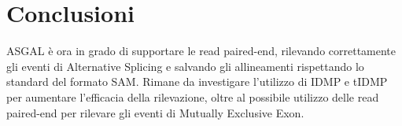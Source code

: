 \section{Conclusioni}
ASGAL è ora in grado di supportare le read paired-end, rilevando correttamente gli eventi di Alternative Splicing e salvando gli allineamenti rispettando lo standard del formato SAM. Rimane da investigare l'utilizzo di IDMP e tIDMP per aumentare l'efficacia della rilevazione, oltre al possibile utilizzo delle read paired-end per rilevare gli eventi di Mutually Exclusive Exon.